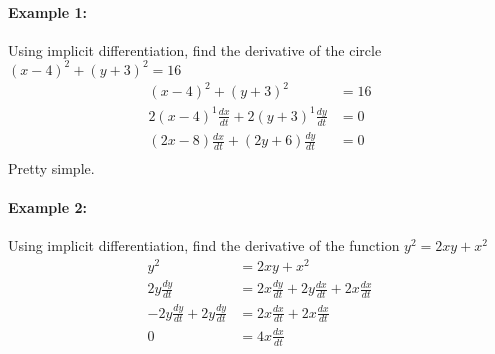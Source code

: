 \documentclass[../revisedMain.tex]{subfiles}
\begin{document}
	\paragraph{Example 1:} Using implicit differentiation, find the derivative of the circle \((x-4)^2+(y+3)^2=16\)
	\begin{equation}
		\begin{split}
		(x-4)^2+(y+3)^2&=16\\
		2(x-4)^1\frac{dx}{dt}+2(y+3)^1\frac{dy}{dt}&=0\\
		(2x-8)\frac{dx}{dt}+(2y+6)\frac{dy}{dt}&=0\\
		\end{split}
	\end{equation}
	Pretty simple.
	\paragraph{Example 2:} Using implicit differentiation, find the derivative of the function \(y^2=2xy+x^2\)
	\begin{equation}
		\begin{split}
		y^2&=2xy+x^2\\
		2y\frac{dy}{dt}&=2x\frac{dy}{dt}+2y\frac{dx}{dt}+2x\frac{dx}{dt}\\
		-2y\frac{dy}{dt}+2y\frac{dy}{dt}&=2x\frac{dx}{dt}+2x\frac{dx}{dt}\\
		0&=4x\frac{dx}{dt}\\
		\end{split}
	\end{equation}\\
\end{document}
